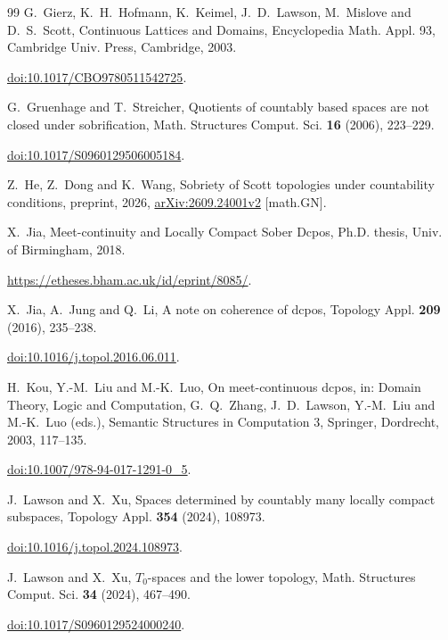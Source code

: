 \documentclass[fleqn,preprint,3p,a4paper]{elsarticle}
\theoremstyle{definition}
\begin{document}
\begin{thebibliography}{99}
G.~Gierz, K.~H.~Hofmann, K.~Keimel, J.~D.~Lawson, M.~Mislove and D.~S.~Scott,
Continuous Lattices and Domains, Encyclopedia Math. Appl. 93,
Cambridge Univ. Press, Cambridge, 2003.
\newblock\par\nobreak\noindent\href{https://doi.org/10.1017/CBO9780511542725}{doi:10.1017/CBO9780511542725}.

G.~Gruenhage and T.~Streicher,
Quotients of countably based spaces are not closed under sobrification,
Math. Structures Comput. Sci. \textbf{16} (2006), 223--229.
\newblock\par\nobreak\noindent\href{https://doi.org/10.1017/S0960129506005184}{doi:10.1017/S0960129506005184}.

Z.~He, Z.~Dong and K.~Wang,
Sobriety of Scott topologies under countability conditions,
preprint, 2026, \href{https://arxiv.org/abs/2609.24001v2}{arXiv:2609.24001v2} [math.GN].

X.~Jia, Meet-continuity and Locally Compact Sober Dcpos,
Ph.D. thesis, Univ. of Birmingham, 2018.
\newblock\par\nobreak\noindent\url{https://etheses.bham.ac.uk/id/eprint/8085/}.

X.~Jia, A.~Jung and Q.~Li, A note on coherence of dcpos,
Topology Appl. \textbf{209} (2016), 235--238.
\newblock\par\nobreak\noindent\href{https://doi.org/10.1016/j.topol.2016.06.011}{doi:10.1016/j.topol.2016.06.011}.

H.~Kou, Y.-M.~Liu and M.-K.~Luo, On meet-continuous dcpos,
in: Domain Theory, Logic and Computation,
G.~Q.~Zhang, J.~D.~Lawson, Y.-M.~Liu and M.-K.~Luo (eds.),
Semantic Structures in Computation 3, Springer, Dordrecht, 2003, 117--135.
\newblock\par\nobreak\noindent\href{https://doi.org/10.1007/978-94-017-1291-0_5}{doi:10.1007/978-94-017-1291-0\_5}.

J.~Lawson and X.~Xu,
Spaces determined by countably many locally compact subspaces,
Topology Appl. \textbf{354} (2024), 108973.
\newblock\par\nobreak\noindent\href{https://doi.org/10.1016/j.topol.2024.108973}{doi:10.1016/j.topol.2024.108973}.

J.~Lawson and X.~Xu, $T_0$-spaces and the lower topology,
Math. Structures Comput. Sci. \textbf{34} (2024), 467--490.
\newblock\par\nobreak\noindent\href{https://doi.org/10.1017/S0960129524000240}{doi:10.1017/S0960129524000240}.


\end{thebibliography}
\end{document}
